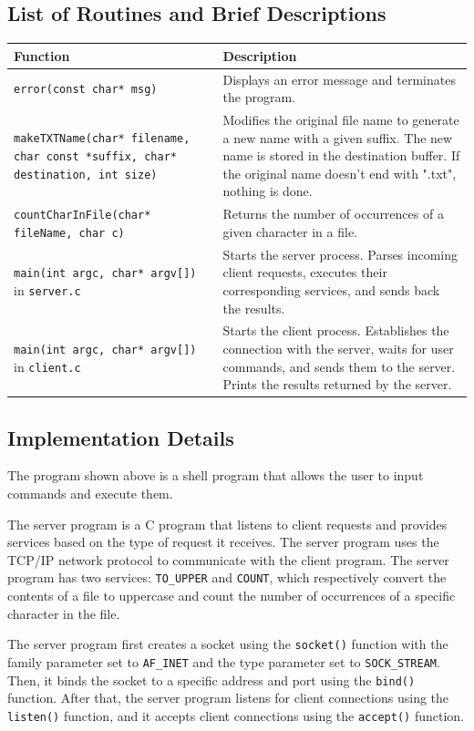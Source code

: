 \documentclass{article}
\begin{document}
\subsection{List of Routines and Brief Descriptions}
\begin{table}[h]
\centering
\begin{tabular}{|p{4cm}|p{9cm}|}
\hline
\textbf{Function} & \textbf{Description} \\ \hline
\texttt{error(const char* msg)} & Displays an error message and terminates the program. \\ \hline
\texttt{makeTXTName(char* filename, char const *suffix, char* destination, int size)} & Modifies the original file name to generate a new name with a given suffix. The new name is stored in the destination buffer. If the original name doesn't end with ".txt", nothing is done. \\ \hline
\texttt{countCharInFile(char* fileName, char c)} & Returns the number of occurrences of a given character in a file. \\ \hline
\texttt{main(int argc, char* argv[])} in \texttt{server.c} & Starts the server process. Parses incoming client requests, executes their corresponding services, and sends back the results. \\ \hline
\texttt{main(int argc, char* argv[])} in \texttt{client.c} & Starts the client process. Establishes the connection with the server, waits for user commands, and sends them to the server. Prints the results returned by the server. \\ \hline
\end{tabular}
\end{table}

\subsection{Implementation Details}
The program shown above is a shell program that allows the user to input commands and execute them.

The server program is a C program that listens to client requests and provides services based on the type of request it receives. The server program uses the TCP/IP network protocol to communicate with the client program. The server program has two services: \texttt{TO\_UPPER} and \texttt{COUNT}, which respectively convert the contents of a file to uppercase and count the number of occurrences of a specific character in the file.

The server program first creates a socket using the \texttt{socket()} function with the family parameter set to \texttt{AF\_INET} and the type parameter set to \texttt{SOCK\_STREAM}. Then, it binds the socket to a specific address and port using the \texttt{bind()} function. After that, the server program listens for client connections using the \texttt{listen()} function, and it accepts client connections using the \texttt{accept()} function.
\end{document}
